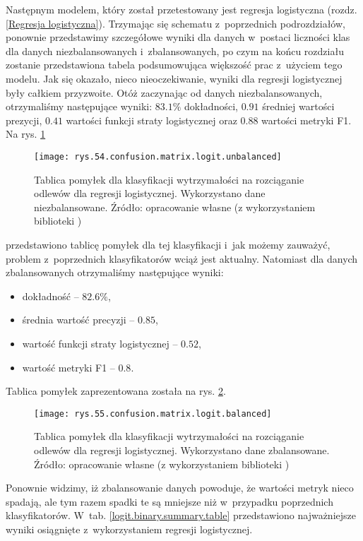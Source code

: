 Następnym modelem, który został przetestowany jest regresja logistyczna (rozdz. \ref{Regresja logistyczna}). Trzymając się schematu z~poprzednich podrozdziałów, ponownie przedstawimy szczegółowe wyniki dla danych w~postaci liczności klas dla danych niezbalansowanych i~zbalansowanych, po czym na końcu rozdziału zostanie przedstawiona tabela podsumowująca większość prac z~użyciem tego modelu. 
Jak się okazało, nieco nieoczekiwanie, wyniki dla regresji logistycznej były całkiem przyzwoite. Otóż zaczynając od danych niezbalansowanych, otrzymaliśmy następujące wyniki: $83.1\%$ dokładności, $0.91$ średniej wartości prezycji, $0.41$ wartości funkcji straty logistycznej oraz $0.88$ wartości metryki F1. Na rys. \ref{rys.54.confusion.matrix.logit.unbalanced} 
\begin{figure}[h]
    \centering
    \texttt{[image: rys.54.confusion.matrix.logit.unbalanced]}
    \caption{Tablica pomyłek dla klasyfikacji wytrzymałości na rozciąganie odlewów dla regresji logistycznej. Wykorzystano dane niezbalansowane. Źródło: opracowanie własne (z wykorzystaniem biblioteki )}
    \label{rys.54.confusion.matrix.logit.unbalanced}
\end{figure}
przedstawiono tablicę pomyłek dla tej klasyfikacji i~jak możemy zauważyć, problem z~poprzednich klasyfikatorów wciąż jest aktualny.
Natomiast dla danych zbalansowanych otrzymaliśmy następujące wyniki:
\begin{itemize}
	\item dokładność – $82.6\%$,
	\item średnia wartość precyzji – $0.85$,
	\item wartość funkcji straty logistycznej – $0.52$,
	\item wartość metryki F1 – $0.8$.
\end{itemize}
Tablica pomyłek zaprezentowana została na rys. \ref{rys.55.confusion.matrix.logit.balanced}. 
\begin{figure}[h]
    \centering
    \texttt{[image: rys.55.confusion.matrix.logit.balanced]}
    \caption{Tablica pomyłek dla klasyfikacji wytrzymałości na rozciąganie odlewów dla regresji logistycznej. Wykorzystano dane zbalansowane. Źródło: opracowanie własne (z wykorzystaniem biblioteki )}
    \label{rys.55.confusion.matrix.logit.balanced}
\end{figure}
Ponownie widzimy, iż zbalansowanie danych powoduje, że wartości metryk nieco spadają, ale tym razem spadki te są mniejsze niż w~przypadku poprzednich klasyfikatorów. W~tab. \ref{logit.binary.summary.table} przedstawiono najważniejsze wyniki osiągnięte z~wykorzystaniem regresji logistycznej.
